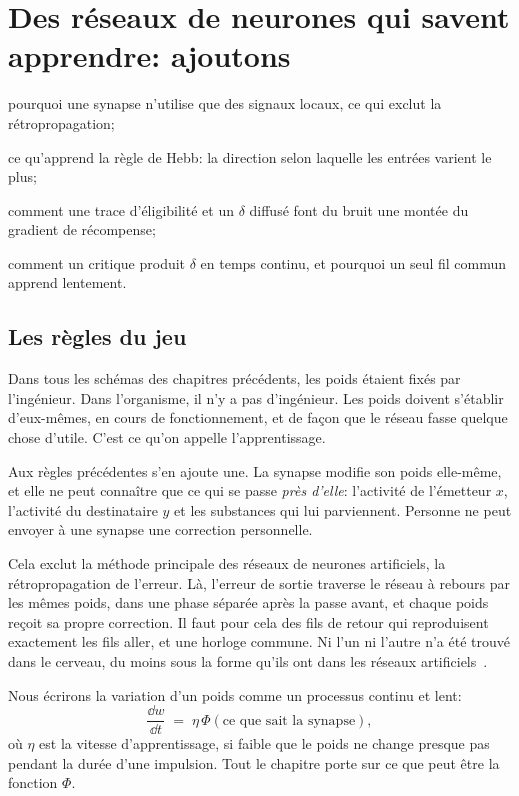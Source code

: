 \chapter{Des réseaux de neurones qui savent apprendre: ajoutons }
\label{sec:dofa}
\begin{chaptergoals}
\item pourquoi une synapse n'utilise que des signaux locaux, ce qui exclut la rétropropagation;
\item ce qu'apprend la règle de Hebb: la direction selon laquelle les entrées varient le plus;
\item comment une trace d'éligibilité et un $\delta$ diffusé font du bruit une montée du gradient de récompense;
\item comment un critique produit $\delta$ en temps continu, et pourquoi un seul fil commun apprend lentement.
\end{chaptergoals}

\section{Les règles du jeu}

Dans tous les schémas des chapitres précédents, les poids étaient fixés par l'ingénieur. Dans l'organisme, il n'y a pas d'ingénieur. Les poids doivent s'établir d'eux-mêmes, en cours de fonctionnement, et de façon que le réseau fasse quelque chose d'utile. C'est ce qu'on appelle l'apprentissage.

Aux règles précédentes s'en ajoute une. La synapse modifie son poids elle-même, et elle ne peut connaître que ce qui se passe \emph{près d'elle}: l'activité de l'émetteur $x$, l'activité du destinataire $y$ et les substances qui lui parviennent. Personne ne peut envoyer à une synapse une correction personnelle.

Cela exclut la méthode principale des réseaux de neurones artificiels, la rétropropagation de l'erreur. Là, l'erreur de sortie traverse le réseau à rebours par les mêmes poids, dans une phase séparée après la passe avant, et chaque poids reçoit sa propre correction. Il faut pour cela des fils de retour qui reproduisent exactement les fils aller, et une horloge commune. Ni l'un ni l'autre n'a été trouvé dans le cerveau, du moins sous la forme qu'ils ont dans les réseaux artificiels~\cite{Lillicrap2020,WhittingtonBogacz2019}.

Nous écrirons la variation d'un poids comme un processus continu et lent:
\begin{equation}
\frac{\dd w}{\dd t} \;=\; \eta\,\Phi(\text{ce que sait la synapse}),
\label{eq:plasticity}
\end{equation}
où $\eta$ est la vitesse d'apprentissage, si faible que le poids ne change presque pas pendant la durée d'une impulsion. Tout le chapitre porte sur ce que peut être la fonction $\Phi$.

